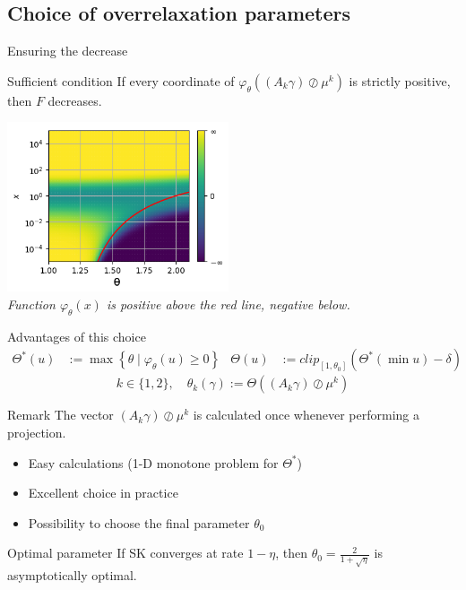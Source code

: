 \documentclass[compress]{beamer}
\begin{document}
\subsection[Choice of OR parameters]{Choice of overrelaxation parameters}
\begin{frame}{Ensuring the decrease}
\begin{block}{Sufficient condition}
	If every coordinate of $\varphi_\theta \left((A_k \gamma) \oslash \mu^k \right)$ is strictly positive, then $F$ decreases.
\end{block}
\begin{center}
	\vspace*{-0.2cm}\includegraphics[height=5cm]{images/cvgce_zone_2.png}\vspace{-0.2cm}\\
	{\small \em Function $\varphi_\theta(x)$ is positive above the red line, negative below.}
\end{center}
\end{frame}

\begin{frame}{Advantages of this choice}
	\begin{align*}
	\Theta^*(u) &:= \max \left\{\theta \mid \varphi_\theta(u) \ge 0 \right\}
	&
	\Theta(u) &:= clip_{[1,\theta_0]}(\Theta^*(\min u)-\delta)
	\end{align*}
	\[
	k \in \{1,2\}, \quad \theta_k (\gamma) := \Theta((A_k \gamma) \oslash \mu^k)
	\]
	
	\begin{block}{Remark}
		The vector $(A_k \gamma)\oslash \mu^k$ is calculated once whenever performing a projection.
	\end{block}
	\pause
	\begin{itemize}
		\item Easy calculations (1-D monotone problem for $\Theta^*$)
		\item Excellent choice in practice
		\item Possibility to choose the final parameter $\theta_0$
	\end{itemize}
	\pause
	\begin{block}{Optimal parameter}
		If SK converges at rate $1-\eta$, then $\theta_0 = \frac{2}{1+\sqrt{\eta}}$ is asymptotically optimal.
	\end{block}
\end{frame}
\end{document}
